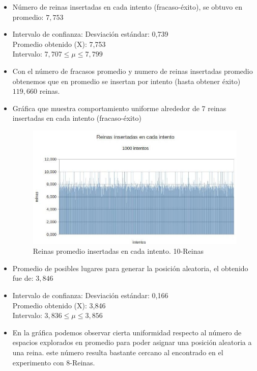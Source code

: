 \documentclass[a4paper,10pt]{article}
\begin{document}
\begin{itemize}
\item Número de reinas insertadas en cada intento (fracaso-éxito), se obtuvo en promedio: $7,753$
\item Intervalo de confianza:
  Desviación estándar: 0,739 \\
  Promedio obtenido (X): 7,753\\
  Intervalo: $ 7,707  \leq \mu \leq 7,799$ \\

\item Con el número de fracasos promedio y numero de reinas insertadas promedio obtenemos que en promedio se insertan por intento (hasta obtener éxito) $119,660$ reinas.
\item Gráfica que muestra comportamiento uniforme alrededor de 7 reinas insertadas en cada intento (fracaso-éxito)

\begin{figure}
 \centering
 \includegraphics[scale=0.5]{reinas10.jpg}
 \caption{Reinas promedio insertadas en cada intento. 10-Reinas}
 \label{fig:rinas10}
\end{figure}

\item Promedio de posibles lugares para generar la posición aleatoria, el obtenido fue de: $3,846$
\item Intervalo de confianza:
  Desviación estándar: 0,166 \\
  Promedio obtenido (X): 3,846\\
  Intervalo: $ 3,836 \leq \mu \leq 3,856$ \\

\item En la gráfica podemos observar cierta uniformidad respecto al número de espacios explorados en promedio para poder asignar una posición aleatoria a una reina. este número resulta
bastante cercano al encontrado en el experimento con 8-Reinas.


\end{itemize}
\end{document}
